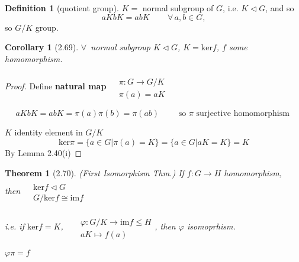 \documentclass[twoside,landscape]{amsart}
\theoremstyle{plain}
\newtheorem{theorem}{Theorem}
\newtheorem{corollary}{Corollary}
\theoremstyle{definition}
\newtheorem{definition}{Definition}
\theoremstyle{remark}
\begin{document}
\begin{multicols*}{2}
\begin{definition}[quotient group]
$K = $ normal subgroup of $G$, i.e. $K \lhd G$, and so 
\[
aK bK = abK \qquad \, \forall \, a,b \in G, 
\]
so $G/K $ group.  
\end{definition}


\begin{corollary}[2.69] $\forall \, $ normal subgroup $K \lhd G$, $K = \text{ker}{f}$, $f$ some homomorphism.  \end{corollary}

\begin{proof} Define \textbf{natural map} $\begin{aligned} & \quad \\ & \pi : G \to G/K \\ & \pi(a) = aK \end{aligned}$

\[
aK bK = abK = \pi(a) \pi(b) = \pi(ab) \quad \quad \text{ so $\pi$ surjective homomorphism }
\]

$K$ identity element in $G/K$ 
\[
\text{ker}{\pi} = \lbrace a \in G | \pi(a) = K \rbrace = \lbrace a \in G | aK = K \rbrace = K 
\]
By Lemma 2.40(i)

\end{proof}

\begin{theorem}[2.70] (First Isomorphism Thm.)
If $f: G \to H$ homomorphism, \\
then $\begin{aligned} & \quad \\ 
  & \text{ker}{f} \lhd G \\ 
  & G/\text{ker}{f} \cong \text{im}{f} \end{aligned}$

i.e. if $\text{ker}{f} = K $, \, $\begin{aligned} & \quad \\ & \varphi : G/K \to \text{im}{f} \leq H \\ & aK \mapsto f(a) \end{aligned}$, then $\varphi$ isomoprhism.  

 \quad \quad $\varphi \pi = f$






\end{theorem}
\end{multicols*}
\end{document}
